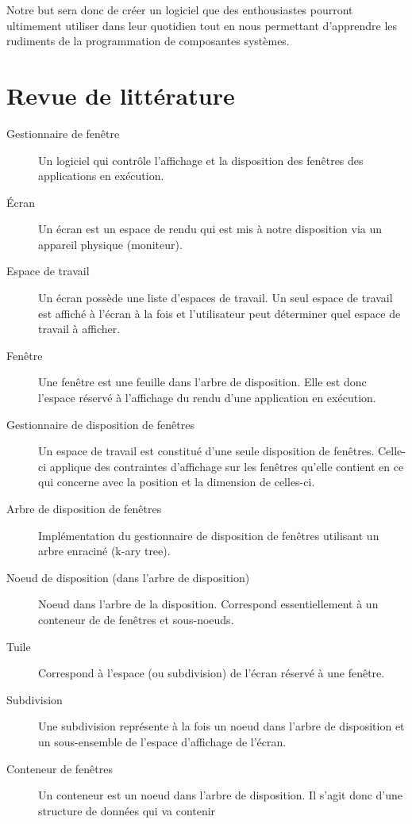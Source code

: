 \documentclass[titlepage]{article}
\begin{document}
\par
\bigskip
Notre but sera donc de créer un logiciel que des enthousiastes pourront
ultimement utiliser dans leur quotidien tout en nous permettant d’apprendre les
rudiments de la programmation de composantes systèmes.

\section{Revue de littérature}
\begin{description}
	\item [Gestionnaire de fenêtre] Un logiciel qui contrôle l’affichage et la
		disposition des fenêtres des applications en exécution.
	\item [Écran] Un écran est un espace de rendu qui est mis à notre
		disposition via un appareil physique (moniteur).
	\item [Espace de travail] Un écran possède une liste d’espaces de travail.
		Un seul espace de travail est affiché à l’écran à la fois et l'utilisateur peut déterminer quel espace de travail à afficher.
	\item [Fenêtre] Une fenêtre est une feuille dans l’arbre de disposition.
		Elle est donc l’espace réservé à l’affichage du rendu d’une application
		en exécution.
	\item [Gestionnaire de disposition de fenêtres]
		\begin{sloppypar}
			Un espace de travail est constitué d’une seule disposition de fenêtres. Celle-ci applique des contraintes d'affichage sur les fenêtres qu'elle contient en ce qui concerne avec la position et la dimension de celles-ci.
		\end{sloppypar}
	\item [Arbre de disposition de fenêtres] Implémentation du gestionnaire de disposition de fenêtres utilisant un arbre enraciné (k-ary tree).
	\item [Noeud de disposition (dans l’arbre de disposition)] Noeud dans
		l’arbre de la disposition. Correspond essentiellement à un conteneur de
		de fenêtres et sous-noeuds.
	\item [Tuile] Correspond à l’espace (ou subdivision) de l’écran réservé à
		une fenêtre.
	\item [Subdivision] Une subdivision représente à la fois un noeud dans
		l’arbre de disposition et un sous-ensemble de l’espace d’affichage de
		l’écran.
	\item [Conteneur de fenêtres] Un conteneur est un noeud dans l’arbre de
		disposition. Il s’agit donc d’une structure de données qui va contenir

\end{description}
\end{document}

